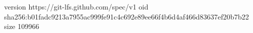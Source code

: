version https://git-lfs.github.com/spec/v1
oid sha256:b01fadc9213a7955ac999fe91c4c692e89ee66f4b6d4af466d83637ef20b7b22
size 109966

